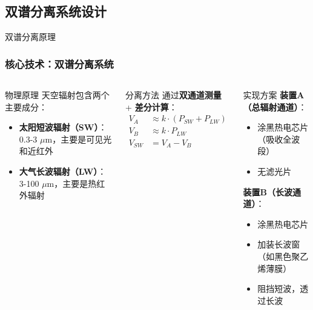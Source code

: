 \documentclass[aspectratio=169,11pt]{ctexbeamer}
\begin{document}
\subsection{双谱分离系统设计}

\begin{frame}{双谱分离原理}
\frametitle{核心技术：双谱分离系统}
\begin{columns}
\begin{block}{物理原理}
天空辐射包含两个主要成分：
\begin{itemize}
    \item \textbf{太阳短波辐射（SW）}：0.3-3 $\mu$m，主要是可见光和近红外
    \item \textbf{大气长波辐射（LW）}：3-100 $\mu$m，主要是热红外辐射
\end{itemize}
\end{block}

\begin{block}{分离方法}
通过\textbf{双通道测量} + \textbf{差分计算}：
\begin{align*}
V_A &\approx k \cdot (P_{SW} + P_{LW}) \\
V_B &\approx k \cdot P_{LW} \\
V_{SW} &= V_A - V_B
\end{align*}
\end{block}

\begin{block}{实现方案}
\textbf{装置A（总辐射通道）}：
\begin{itemize}
    \item 涂黑热电芯片（吸收全波段）
    \item 无滤光片
\end{itemize}

\textbf{装置B（长波通道）}：
\begin{itemize}
    \item 涂黑热电芯片
    \item 加装长波窗（如黑色聚乙烯薄膜）
    \item 阻挡短波，透过长波
\end{itemize}
\end{block}
\end{columns}
\end{frame}
\end{document}
